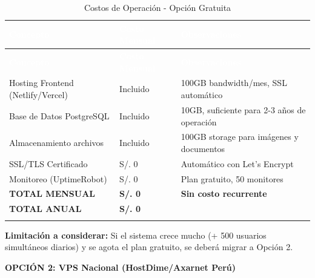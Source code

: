 \documentclass[12pt,a4paper]{article}
\begin{document}
\begin{longtable}{|>{\raggedright\arraybackslash}p{5cm}|>{\centering\arraybackslash}p{3cm}|>{\raggedright\arraybackslash}p{6cm}|}
\hline
\rowcolor{headercolor}
\textcolor{white}{\textbf{Concepto}} & \textcolor{white}{\textbf{Costo Mensual}} & \textcolor{white}{\textbf{Observaciones}} \\
\hline
\endfirsthead
\hline
\rowcolor{headercolor}
\textcolor{white}{\textbf{Concepto}} & \textcolor{white}{\textbf{Costo Mensual}} & \textcolor{white}{\textbf{Observaciones}} \\
\hline
\endhead
\hline
\endlastfoot

Hosting Frontend (Netlify/Vercel) & Incluido & 100GB bandwidth/mes, SSL automático \\
\hline
\rowcolor{rowgray}
Base de Datos PostgreSQL & Incluido & 10GB, suficiente para 2-3 años de operación \\
\hline
Almacenamiento archivos & Incluido & 100GB storage para imágenes y documentos \\
\hline
\rowcolor{rowgray}
SSL/TLS Certificado & S/. 0 & Automático con Let's Encrypt \\
\hline
Monitoreo (UptimeRobot) & S/. 0 & Plan gratuito, 50 monitores \\
\hline
\rowcolor{rowgray}
\textbf{TOTAL MENSUAL} & \textbf{S/. 0} & \textbf{Sin costo recurrente} \\
\hline
\textbf{TOTAL ANUAL} & \textbf{S/. 0} & \\
\hline
\caption{Costos de Operación - Opción Gratuita}
\end{longtable}

\textbf{Limitación a considerar:} Si el sistema crece mucho (+ 500 usuarios simultáneos diarios) y se agota el plan gratuito, se deberá migrar a Opción 2.

\textbf{OPCIÓN 2: VPS Nacional (HostDime/Axarnet Perú)}
\end{document}
